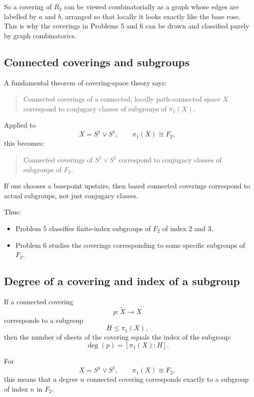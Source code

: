 \documentclass[12pt,a4paper]{article}
\theoremstyle{notespace}
\begin{document}
So a covering of \(R_2\) can be viewed combinatorially as a graph whose edges are labelled by \(a\) and \(b\), arranged so that locally it looks exactly like the base rose. This is why the coverings in Problems 5 and 6 can be drawn and classified purely by graph combinatorics.

\bigskip

\subsection{Connected coverings and subgroups}

A fundamental theorem of covering-space theory says:
\begin{quote}
	Connected coverings of a connected, locally path-connected space \(X\) correspond to conjugacy classes of subgroups of \(\pi_1(X)\).
\end{quote}

Applied to
\[
X=S^1\vee S^1,
\qquad
\pi_1(X)\cong F_2,
\]
this becomes:
\begin{quote}
	Connected coverings of \(S^1\vee S^1\) correspond to conjugacy classes of subgroups of \(F_2\).
\end{quote}

If one chooses a basepoint upstairs, then based connected coverings correspond to actual subgroups, not just conjugacy classes.

Thus:
\begin{itemize}
	\item Problem 5 classifies finite-index subgroups of \(F_2\) of index \(2\) and \(3\),
	\item Problem 6 studies the coverings corresponding to some specific subgroups of \(F_2\).
\end{itemize}

\bigskip

\subsection{Degree of a covering and index of a subgroup}

If a connected covering
\[
p:\widetilde X\to X
\]
corresponds to a subgroup
\[
H\leq \pi_1(X),
\]
then the number of sheets of the covering equals the index of the subgroup:
\[
\deg(p)=[\pi_1(X):H].
\]

For
\[
X=S^1\vee S^1,
\qquad
\pi_1(X)\cong F_2,
\]
this means that a degree \(n\) connected covering corresponds exactly to a subgroup of index \(n\) in \(F_2\).
\end{document}
